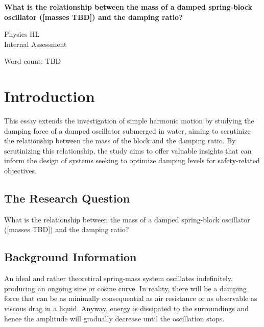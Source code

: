 \documentclass[a4paper,12pt]{article}
\begin{document}
\setlength{\belowcaptionskip}{-10pt}


\pagestyle{fancy}


\begin{titlepage}
  \begin{center}
    \vspace*{3cm}

    {\textbf{\Large{What is the relationship between the mass of a damped spring-block oscillator ([masses TBD]) and the damping ratio?}}}

    \vspace{1cm}
    \large{Physics HL}\\
    \large{Internal Assessment}


    \vfill

    \vspace{1.5cm}

    Word count: TBD

  \end{center}
\end{titlepage}
\pagebreak
\tableofcontents
\pagebreak

\clearpage
\setcounter{page}{1}

\section{Introduction}
This essay extends the investigation of simple harmonic motion by studying the damping force of a damped oscillator submerged in water, aiming to scrutinize the relationship between the mass of the block and the damping ratio. By scrutinizing this relationship, the study aims to offer valuable insights that can inform the design of systems seeking to optimize damping levels for safety-related objectives.


\subsection{The Research Question}
What is the relationship between the mass of a damped spring-block oscillator ([masses TBD]) and the damping ratio?

\subsection{Background Information}
An ideal and rather theoretical spring-mass system oscillates indefinitely, producing an ongoing sine or cosine curve. In reality, there will be a damping force that can be as minimally consequential as air resistance or as observable as viscous drag in a liquid. Anyway, energy is dissipated to the surroundings and hence the amplitude will gradually decrease until the oscillation stops.
\end{document}
